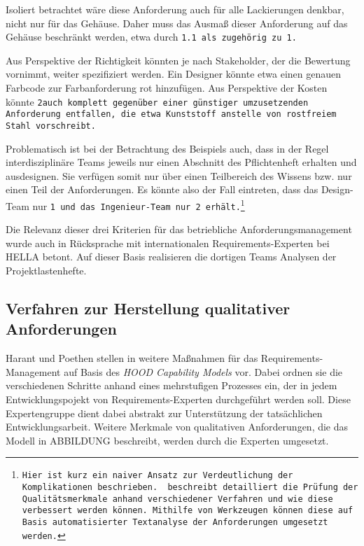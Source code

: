 \documentclass[12pt]{report}
\begin{document}
Isoliert betrachtet wäre diese Anforderung auch für alle Lackierungen denkbar, nicht nur für das Gehäuse. Daher muss das Ausmaß dieser Anforderung auf das Gehäuse beschränkt werden, etwa durch \tt 1.1 \rm als zugehörig zu \tt 1\rm.

Aus Perspektive der Richtigkeit könnten je nach Stakeholder, der die Bewertung vornimmt, weiter spezifiziert werden. Ein Designer könnte etwa einen genauen Farbcode zur Farbanforderung \glqq rot\grqq{} hinzufügen. Aus Perspektive der Kosten könnte \tt 2\rm auch komplett gegenüber einer günstiger umzusetzenden Anforderung entfallen, die etwa \glqq Kunststoff\grqq{} anstelle von \glqq rostfreiem Stahl\grqq{} vorschreibt.

Problematisch ist bei der Betrachtung des Beispiels auch, dass in der Regel interdisziplinäre Teams jeweils nur einen Abschnitt des Pflichtenheft erhalten und ausdesignen. Sie verfügen somit nur über einen Teilbereich des Wissens bzw. nur einen Teil der Anforderungen. Es könnte also der Fall eintreten, dass das Design-Team nur \tt 1 \rm und das Ingenieur-Team nur \tt 2 \rm erhält.\footnote{Hier ist kurz ein naiver Ansatz zur Verdeutlichung der Komplikationen beschrieben. \cite{zg02} beschreibt detailliert die Prüfung der Qualitätsmerkmale anhand verschiedener Verfahren und wie diese verbessert werden können. Mithilfe von Werkzeugen können diese auf Basis automatisierter Textanalyse der Anforderungen umgesetzt werden.}

Die Relevanz dieser drei Kriterien für das betriebliche Anforderungsmanagement wurde auch in Rücksprache mit internationalen Requirements-Experten bei HELLA betont. Auf dieser Basis realisieren die dortigen Teams Analysen der Projektlastenhefte. 

\subsection{Verfahren zur Herstellung qualitativer Anforderungen}
Harant und Poethen stellen in \cite{} weitere Maßnahmen für das Requirements-Management auf Basis des \textit{HOOD Capability Models} vor. Dabei ordnen sie die verschiedenen Schritte anhand eines mehrstufigen Prozesses ein, der in jedem Entwicklungspojekt von Requirements-Experten durchgeführt werden soll. Diese Expertengruppe dient dabei abstrakt zur Unterstützung der tatsächlichen Entwicklungsarbeit. Weitere Merkmale von qualitativen Anforderungen, die das Modell in ABBILDUNG beschreibt, werden durch die Experten umgesetzt. 
\end{document}
